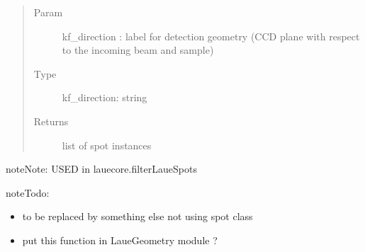 \documentclass[letterpaper,10pt,english]{sphinxmanual}
\begin{document}
\begin{fulllineitems}
\begin{quote}
\begin{description}
\item[{Param}] \leavevmode
kf\_direction : label for detection geometry
(CCD plane with respect to
the incoming beam and sample)

\item[{Type}] \leavevmode
kf\_direction: string

\item[{Returns}] \leavevmode
list of spot instances

\end{description}\end{quote}

\begin{sphinxadmonition}{note}{Note:}
USED in lauecore.filterLaueSpots
\end{sphinxadmonition}

\begin{sphinxadmonition}{note}{\label{Simulation_Module:index-1}Todo:}\begin{itemize}
\item {} 
to be replaced by something else not using spot class

\item {} 
put this function in LaueGeometry module ?

\end{itemize}
\end{sphinxadmonition}

\end{fulllineitems}

\end{document}
